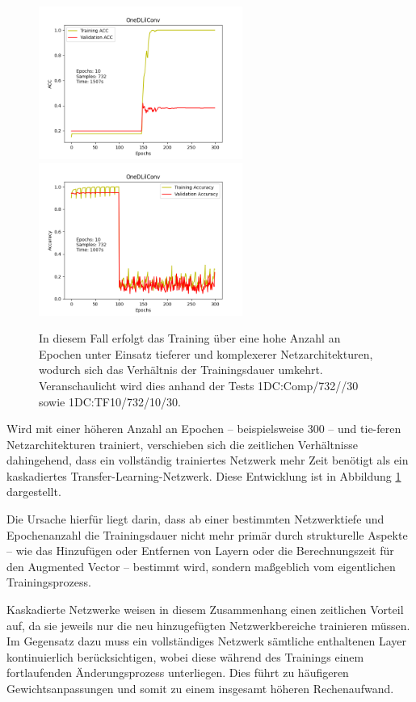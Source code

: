 \begin{figure}[htpb]
    \includegraphics[height=5cm]{../../Plots/ba_plots/classnocascade/1dc.png}
    \includegraphics[height=5cm]{../../Plots/ba_plots/classTF/1dc_tr.png}
    \caption{\label{fig:timeother} 
    \small{In diesem Fall erfolgt das Training über eine hohe Anzahl an Epochen unter Einsatz tieferer und komplexerer Netzarchitekturen, 
    wodurch sich das Verhältnis der Trainingsdauer umkehrt. Veranschaulicht wird dies anhand der Tests 1DC:Comp/732//30 sowie 1DC:TF10/732/10/30.}}
\end{figure}

Wird mit einer höheren Anzahl an Epochen – beispielsweise 300 – und tie-feren Netzarchitekturen trainiert, verschieben sich die zeitlichen 
Verhältnisse dahingehend, dass ein vollständig trainiertes Netzwerk mehr Zeit benötigt als ein kaskadiertes Transfer-Learning-Netzwerk. Diese 
Entwicklung ist in Abbildung \ref{fig:timeother} dargestellt.

Die Ursache hierfür liegt darin, dass ab einer bestimmten Netzwerktiefe und Epochenanzahl die Trainingsdauer nicht mehr primär durch 
strukturelle Aspekte – wie das Hinzufügen oder Entfernen von Layern oder die Berechnungszeit für den Augmented Vector – bestimmt wird, 
sondern maßgeblich vom eigentlichen Trainingsprozess.

Kaskadierte Netzwerke weisen in diesem Zusammenhang einen zeitlichen Vorteil auf, da sie jeweils nur die neu hinzugefügten Netzwerkbereiche 
trainieren müssen. Im Gegensatz dazu muss ein vollständiges Netzwerk sämtliche enthaltenen Layer kontinuierlich berücksichtigen, wobei diese 
während des Trainings einem fortlaufenden Änderungsprozess unterliegen. Dies führt zu häufigeren Gewichtsanpassungen und somit zu einem 
insgesamt höheren Rechenaufwand.
